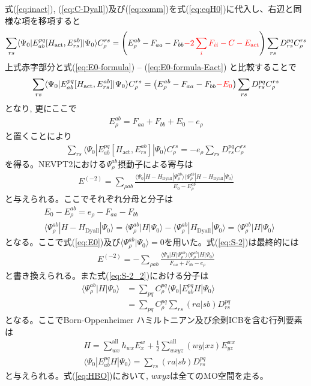 \documentclass[11pt,pra,aps]{revtex4}
\newcommand{\red}[1]{\textcolor{red}{#1}}
\begin{document}
式(\ref{eq:inact}), (\ref{eq:C-Dyall})及び(\ref{eq:comm})を式(\ref{eq:eqH0})に代入し、右辺と同様な項を移項すると
\begin{align}
  \sum_{rs} \langle\Psi_0|E^{pq}_{ab}[H_\text{act},E_{rs}^{ab}]|\Psi_0\rangle C_\rho^{rs}=\left(E_{\rho}^{ab}-F_{aa}-F_{bb}\red{-2\sum_i F_{ii}-C-E_\text{act}}\right)\sum_{rs} D^{pq}_{rs} C_\rho^{rs} \label{eq:eqH0_2}
\end{align}
上式赤字部分と式(\ref{eq:E0-formula}) -- (\ref{eq:E0-formula-Eact}) と比較することで
\begin{align}
  \sum_{rs} \langle\Psi_0|E^{pq}_{ab}[H_\text{act},E_{rs}^{ab}]|\Psi_0\rangle C_\rho^{rs}=\left(E_{\rho}^{ab}-F_{aa}-F_{bb}\red{-E_0}\right)\sum_{rs} D^{pq}_{rs} C_\rho^{rs} \label{eq:eqH0_2}
\end{align}
となり, 更にここで
\begin{align}
  E_{\rho}^{ab}=F_{aa}+F_{bb}+E_0-e_\rho
\end{align}
と置くことにより
\begin{align}
  \sum_{rs} \langle\Psi_0|E^{pq}_{ab}[H_\text{act},E_{rs}^{ab}]|\Psi_0\rangle C_\rho^{rs}=-e_\rho\sum_{rs} D^{pq}_{rs} C_\rho^{rs} \label{eq:eqH0_3}
\end{align}
を得る。NEVPT2における$\Psi_\rho^{ab}$摂動子による寄与は
\begin{align}
  E^{(-2)}=\sum_{\rho ab} \frac{\langle\Psi_0|H-H_\text{Dyall}|\Psi_{\rho}^{ab}\rangle\langle\Psi_{\rho}^{ab}|H-H_\text{Dyall}|\Psi_0\rangle}{E_0-E_\rho^{ab}} \label{eq:S-2}
\end{align}
と与えられる。ここでそれぞれ分母と分子は
\begin{align}
  &E_0-E_{\rho}^{ab}=e_\rho-F_{aa}-F_{bb} \\
  &\langle\Psi_{\rho}^{ab}|H-H_\text{Dyall}|\Psi_0\rangle=\langle\Psi_{\rho}^{ab}|H|\Psi_0\rangle-\langle\Psi_{\rho}^{ab}|H_\text{Dyall}|\Psi_0\rangle=\langle\Psi_{\rho}^{ab}|H|\Psi_0\rangle \label{eq:num}
\end{align}
となる。ここで式(\ref{eq:E0})及び$\langle\Psi_{\rho}^{ab}|\Psi_0\rangle=0$を用いた。式(\ref{eq:S-2})は最終的には
\begin{align}
  E^{(-2)}=-\sum_{\rho ab} \frac{\langle\Psi_0|H|\Psi_{\rho}^{ab}\rangle\langle\Psi_{\rho}^{ab}|H|\Psi_0\rangle}{F_{aa}+F_{bb}-e_\rho} \label{eq:S-2_2}
\end{align}
と書き換えられる。また式(\ref{eq:S-2_2})における分子は
\begin{align}
  \langle\Psi_{\rho}^{ab}|H|\Psi_0\rangle&=\sum_{pq}C_\rho^{pq} \langle\Psi_0|E_{ab}^{pq}H|\Psi_0\rangle \nonumber \\
  &=\sum_{pq}C_\rho^{pq} \sum_{rs} (ra|sb) D^{pq}_{rs}
\end{align}
となる。ここでBorn-Oppenheimer ハミルトニアン及び余剰ICBを含む行列要素は
\begin{align}
  &H=\sum_{wx}^\text{all} h_{wx} E^w_x+\frac{1}{2}\sum_{wxyz}^\text{all} (wy|xz) E^{wx}_{yz} \label{eq:HBO} \\
  &\langle\Psi_0|E_{ab}^{pq}H|\Psi_0\rangle=\sum_{rs} (ra|sb) D^{pq}_{rs} \label{eq:numerator}
\end{align}
と与えられる。式(\ref{eq:HBO})において, $wxyz$は全てのMO空間を走る。
\end{document}
